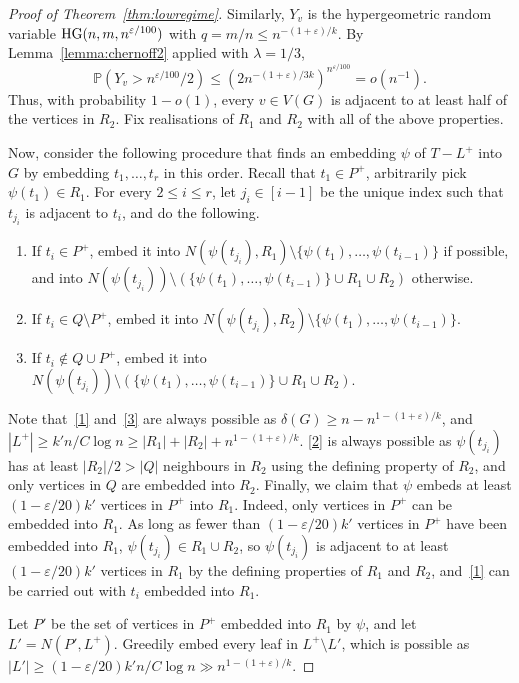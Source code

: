 \documentclass{article}
\theoremstyle{plain}
\theoremstyle{definition}
\numberwithin{equation}{section}
\def\eps{\varepsilon}
\begin{document}
\begin{proof}[Proof of Theorem~\ref{thm:lowregime}]
Similarly, $Y_v$ is the hypergeometric random variable $\textup{HG}(n,m,n^{\eps/100})$ with $q=m/n\leq n^{-(1+\eps)/k}$. By Lemma~\ref{lemma:chernoff2} applied with $\lambda=1/3$,
\[\mathbb{P}(Y_v>n^{\eps/100}/2)\leq(2n^{-(1+\eps)/3k})^{n^{\eps/100}}=o(n^{-1}).\] 
Thus, with probability $1-o(1)$, every $v\in V(G)$ is adjacent to at least half of the vertices in $R_2$. Fix realisations of $R_1$ and $R_2$ with all of the above properties.

Now, consider the following procedure that finds an embedding $\psi$ of $T-L^+$ into $G$ by embedding $t_1,\ldots,t_r$ in this order. Recall that $t_1\in P^+$, arbitrarily pick $\psi(t_1)\in R_1$. For every $2\leq i\leq r$, let $j_i\in[i-1]$ be the unique index such that $t_{j_i}$ is adjacent to $t_i$, and do the following. 
\begin{enumerate}[label=\alph*)]
    \item\label{1} If $t_i\in P^+$, embed it into $N(\psi(t_{j_i}),R_1)\setminus\{\psi(t_1),\ldots,\psi(t_{i-1})\}$ if possible, and into $N(\psi(t_{j_i}))\setminus(\{\psi(t_1),\ldots,\psi(t_{i-1})\}\cup R_1\cup R_2)$ otherwise.
    \item\label{2} If $t_i\in Q\setminus P^+$, embed it into $N(\psi(t_{j_i}),R_2)\setminus\{\psi(t_1),\ldots,\psi(t_{i-1})\}$.
    \item\label{3} If $t_i\not\in Q\cup P^+$, embed it into $N(\psi(t_{j_i}))\setminus(\{\psi(t_1),\ldots,\psi(t_{i-1})\}\cup R_1\cup R_2)$. 
\end{enumerate}

Note that~\ref{1} and~\ref{3} are always possible as $\delta(G)\geq n-n^{1-(1+\eps)/k}$, and $|L^+|\geq k'n/C\log n\geq|R_1|+|R_2|+n^{1-(1+\eps)/k}$. \ref{2} is always possible as $\psi(t_{j_i})$ has at least $|R_2|/2>|Q|$ neighbours in $R_2$ using the defining property of $R_2$, and only vertices in $Q$ are embedded into $R_2$. Finally, we claim that $\psi$ embeds at least $(1-\eps/20)k'$ vertices in $P^+$ into $R_1$. Indeed, only vertices in $P^+$ can be embedded into $R_1$. As long as fewer than $(1-\eps/20)k'$ vertices in $P^+$ have been embedded into $R_1$, $\psi(t_{j_i})\in R_1\cup R_2$, so $\psi(t_{j_i})$ is adjacent to at least $(1-\eps/20)k'$ vertices in $R_1$ by the defining properties of $R_1$ and $R_2$, and~\ref{1} can be carried out with $t_i$ embedded into $R_1$.

Let $P'$ be the set of vertices in $P^+$ embedded into $R_1$ by $\psi$, and let $L'=N(P',L^+)$. Greedily embed every leaf in $L^+\setminus L'$, which is possible as $|L'|\geq(1-\eps/20)k'n/C\log n\gg n^{1-(1+\eps)/k}$.


\end{proof}
\end{document}
